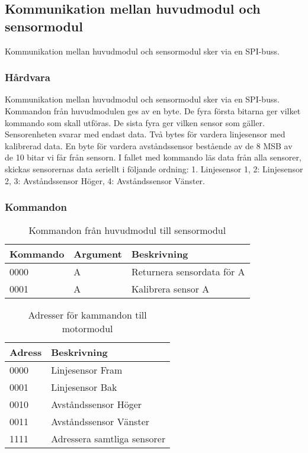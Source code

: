 \subsection{Kommunikation mellan huvudmodul och sensormodul}
Kommunikation mellan huvudmodul och sensormodul sker via en SPI-buss. 

\subsubsection{Hårdvara}
Kommunikation mellan huvudmodul och sensormodul sker via en SPI-buss. Kommandon från huvudmodulen ges av en byte. De fyra första bitarna ger vilket kommando som skall utföras. De sista fyra ger vilken sensor som gäller. 
Sensorenheten svarar med endast data. Två bytes för vardera linjesensor med kalibrerad data. En byte för vardera avståndssensor bestående av de 8 MSB av de 10 bitar vi får från sensorn. I fallet med kommando läs data från alla sensorer, skickas sensorernas data seriellt i följande ordning: 1. Linjesensor 1, 2: Linjesensor 2, 3: Avståndssensor Höger, 4: Avståndssensor Vänster.

\subsubsection{Kommandon}

\begin{table}[h]
	\centering
		\begin{tabularx}{\textwidth}{| l | l | X |}
			\hline
			\textbf{Kommando} & \textbf{Argument} & \textbf{Beskrivning} \\
			\hline
			{0000} & {A} & {Returnera sensordata för A} \\
			\hline
			{0001} & {A} & {Kalibrera sensor A} \\
			\hline
		\end{tabularx}
	\caption{Kommandon från huvudmodul till sensormodul} \label{protokoll:huvud-sensor}
\end{table}

\begin{table}[h]
	\centering
		\begin{tabularx}{\textwidth}{| l | X |}
			\hline
			\textbf{Adress} & \textbf{Beskrivning} \\
			\hline
			{0000} & {Linjesensor Fram} \\
			\hline
			{0001} & {Linjesensor Bak} \\
			\hline
			{0010} & {Avståndssensor Höger} \\
			\hline
			{0011} & {Avståndssensor Vänster} \\
			\hline
			{1111} & {Adressera samtliga sensorer} \\
			\hline
		\end{tabularx}
	\caption{Adresser för kammandon till motormodul} \label{protokoll:huvud-sensor-adress}
\end{table}

